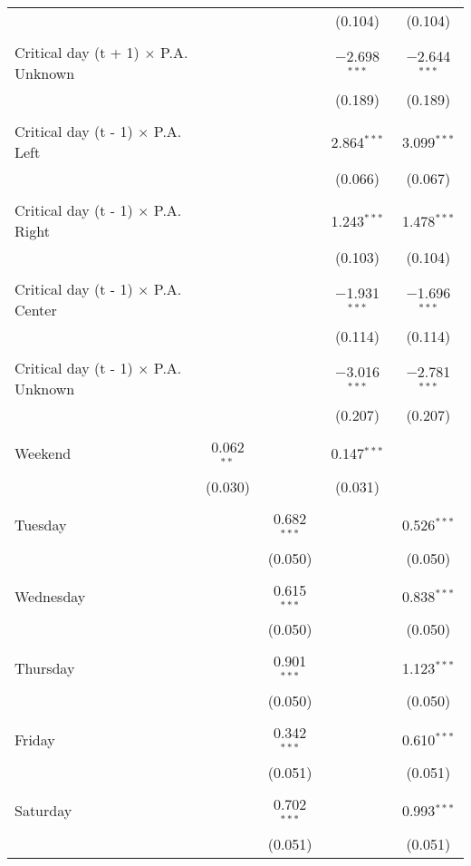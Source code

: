 \documentclass[
]{article}
\begin{document}
\begin{table}[!htbp]
{\begin{tabular}{@{\extracolsep{5pt}}lcccc}
  &  &  & (0.104) & (0.104) \\ 
  & & & & \\ 
 Critical day (t + 1) $\times$ P.A. Unknown &  &  & $-$2.698$^{***}$ & $-$2.644$^{***}$ \\ 
  &  &  & (0.189) & (0.189) \\ 
  & & & & \\ 
 Critical day (t - 1) $\times$ P.A. Left &  &  & 2.864$^{***}$ & 3.099$^{***}$ \\ 
  &  &  & (0.066) & (0.067) \\ 
  & & & & \\ 
 Critical day (t - 1) $\times$ P.A. Right &  &  & 1.243$^{***}$ & 1.478$^{***}$ \\ 
  &  &  & (0.103) & (0.104) \\ 
  & & & & \\ 
 Critical day (t - 1) $\times$ P.A. Center &  &  & $-$1.931$^{***}$ & $-$1.696$^{***}$ \\ 
  &  &  & (0.114) & (0.114) \\ 
  & & & & \\ 
 Critical day (t - 1) $\times$ P.A. Unknown &  &  & $-$3.016$^{***}$ & $-$2.781$^{***}$ \\ 
  &  &  & (0.207) & (0.207) \\ 
  & & & & \\ 
 Weekend & 0.062$^{**}$ &  & 0.147$^{***}$ &  \\ 
  & (0.030) &  & (0.031) &  \\ 
  & & & & \\ 
 Tuesday &  & 0.682$^{***}$ &  & 0.526$^{***}$ \\ 
  &  & (0.050) &  & (0.050) \\ 
  & & & & \\ 
 Wednesday &  & 0.615$^{***}$ &  & 0.838$^{***}$ \\ 
  &  & (0.050) &  & (0.050) \\ 
  & & & & \\ 
 Thursday &  & 0.901$^{***}$ &  & 1.123$^{***}$ \\ 
  &  & (0.050) &  & (0.050) \\ 
  & & & & \\ 
 Friday &  & 0.342$^{***}$ &  & 0.610$^{***}$ \\ 
  &  & (0.051) &  & (0.051) \\ 
  & & & & \\ 
 Saturday &  & 0.702$^{***}$ &  & 0.993$^{***}$ \\ 
  &  & (0.051) &  & (0.051) \\ 

\end{tabular}}
\end{table}
\end{document}
